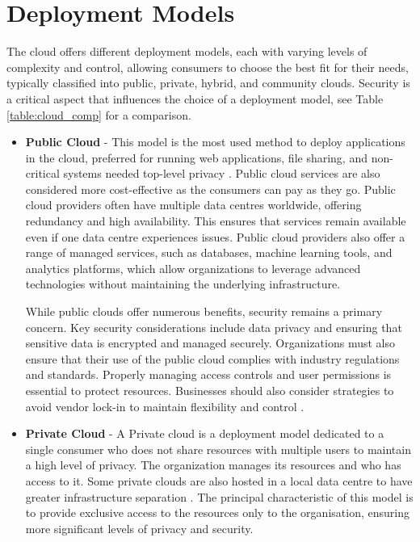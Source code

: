 \section{Deployment Models}
The cloud offers different deployment models, each with varying levels of complexity and control, allowing consumers to choose the best fit for their needs, typically classified into public, private, hybrid, and community clouds. Security is a critical aspect that influences the choice of a deployment model, see Table \ref{table:cloud_comp} for a comparison. 
\begin{itemize}
    \item  \textbf{Public Cloud} - This model is the most used method to deploy applications in the cloud, preferred for running web applications, file sharing, and non-critical systems needed top-level privacy \citep{cloudmodel}. Public cloud services are also considered more cost-effective as the consumers can pay as they go. Public cloud providers often have multiple data centres worldwide, offering redundancy and high availability. This ensures that services remain available even if one data centre experiences issues. Public cloud providers also offer a range of managed services, such as databases, machine learning tools, and analytics platforms, which allow organizations to leverage advanced technologies without maintaining the underlying infrastructure. 
    
    While public clouds offer numerous benefits, security remains a primary concern. Key security considerations include data privacy and ensuring that sensitive data is encrypted and managed securely. Organizations must also ensure that their use of the public cloud complies with industry regulations and standards. Properly managing access controls and user permissions is essential to protect resources. Businesses should also consider strategies to avoid vendor lock-in to maintain flexibility and control  \citep{cloudmodel}.
    
    \item  \textbf{Private Cloud} - A Private cloud is a deployment model dedicated to a single consumer who does not share resources with multiple users to maintain a high level of privacy. The organization manages its resources and who has access to it. Some private clouds are also hosted in a local data centre to have greater infrastructure separation \citep{cloudmodel}. The principal characteristic of this model is to provide exclusive access to the resources only to the organisation, ensuring more significant levels of privacy and security. 
    

\end{itemize}
